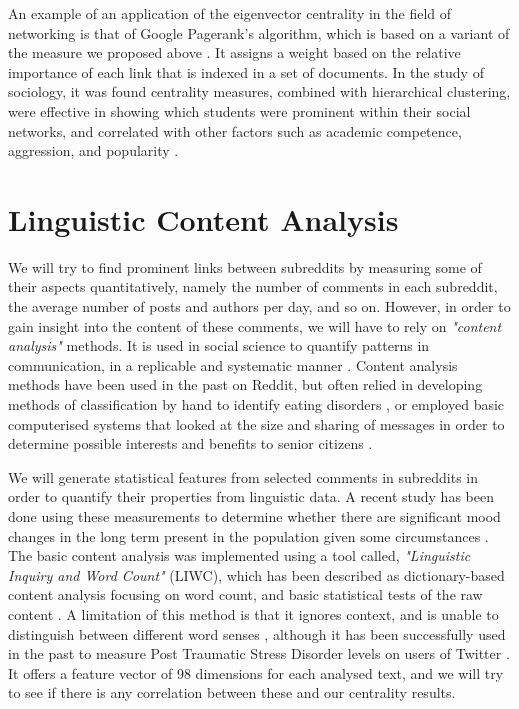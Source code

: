 \documentclass[bsc,frontabs,twoside,singlespacing,parskip,deptreport]{infthesis}
\begin{document}
An example of an application of the eigenvector centrality in the field of networking is that of Google Pagerank's algorithm, which is based on a variant of the measure we proposed above \cite{pagerank}. It assigns a weight based on the relative importance of each link that is indexed in a set of documents. In the study of sociology, it was found centrality measures, combined with hierarchical clustering, were effective in showing which students were prominent within their social networks, and correlated with other factors such as academic competence, aggression, and popularity \cite{xie1999social}.

\section{Linguistic Content Analysis}\label{linguistic-content-analysis}
We will try to find prominent links between subreddits by measuring some of their aspects quantitatively, namely the number of comments in each subreddit, the average number of posts and authors per day, and so on. However, in order to gain insight into the content of these comments, we will have to rely on \textit{"content analysis"} methods. It is used in social science to quantify patterns in communication, in a replicable and systematic manner \cite{BrymanAlan2015Brm}. Content analysis methods have been used in the past on Reddit, but often relied in developing methods of classification by hand to identify eating disorders \cite{sowlesShainaJ.2018Acao}, or employed basic computerised systems that looked at the size and sharing of messages in order to determine possible interests and benefits to senior citizens \cite{nimrodGalit2010SOCA}. 

We will generate statistical features from selected comments in subreddits in order to quantify their properties from linguistic data. A recent study has been done using these measurements to determine whether there are significant mood changes in the long term present in the population given some circumstances \cite{ethayarajhKawin2017TEoP}. The basic content analysis was implemented using a tool called, \textit{"Linguistic Inquiry and Word Count"} (LIWC), which has been described as dictionary-based content analysis focusing on word count, and basic statistical tests of the raw content \cite{lowe2002software} \cite{masters}. A limitation of this method is that it ignores context, and is unable to distinguish between different word senses \cite{ethayarajhKawin2017TEoP}, although it has been successfully used in the past to measure Post Traumatic Stress Disorder levels on users of Twitter \cite{harman2014measuring}. It offers a feature vector of 98 dimensions for each analysed text, and we will try to see if there is any correlation between these and our centrality results.
\end{document}
